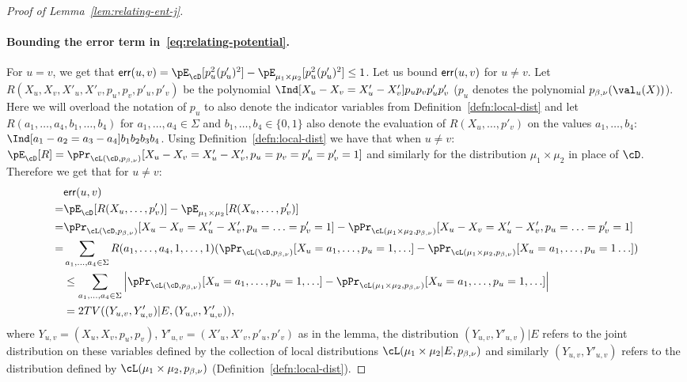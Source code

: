 \begin{proof}[Proof of Lemma~\ref{lem:relating-ent-j}]
\paragraph{Bounding the error term in~\eqref{eq:relating-potential}.} 
For $u = v$, we get that ${\sf err}(u,v) = \pE_{\cD}[p_u^2 (p'_u)^2] - \pE_{\mu_1 \times \mu_2}[p_u^2 (p'_u)^2] \leq 1$. Let us bound ${\sf err}(u,v)$ for $u \neq v$.
Let $R(X_u,X_v,X'_u,X'_v,p_{u},p_{v}, p'_u,p'_v)$ be the polynomial $\Ind[X_u - X_v = X'_u- X'_v]p_u p_v p'_u p'_v$ ($p_u$ denotes the polynomial $p_{\beta,\nu}(\val_u(X))$). Here we will overload the notation of $p_u$ to also denote the indicator variables from Definition~\ref{defn:local-dist} and let $R(a_1,\ldots,a_4,b_1,\ldots,b_4)$ for $a_1,\ldots,a_4 \in \Sigma$ and $b_1,\ldots,b_4 \in \{0,1\}$ also denote the evaluation of $R(X_u,\ldots,p'_v)$ on the values $a_1,\ldots,b_4$: $\Ind[a_1 - a_2 = a_3- a_4]b_1 b_2b_3 b_4$. Using Definition~\ref{defn:local-dist} we have that when $u \neq v$: $\pE_{\cD}[R] = \pPr_{\cL(\cD,p_{\beta,\nu})}[X_u - X_v = X'_u - X'_v, p_u = p_v = p'_u = p'_v = 1]$ and similarly for the distribution $\mu_1 \times \mu_2$ in place of $\cD$. Therefore we get that for $u \neq v$: 
\begin{align*}
&{\sf err}(u,v)\\
=&\pE_{\cD}[R(X_u,\ldots,p'_v)] - \pE_{\mu_1 \times \mu_2}[R(X_u,\ldots,p'_v)] \\
=&\pPr_{\cL(\cD,p_{\beta,\nu})}[X_u - X_v = X'_u - X'_v, p_u = \ldots =p'_v = 1] - \pPr_{\cL(\mu_1 \times \mu_2,p_{\beta,\nu})}[X_u - X_v = X'_u - X'_v, p_u = \ldots = p'_v = 1]\\
=&\sum_{\substack{a_1,\ldots,a_4 \in \Sigma}}  R(a_1,\ldots,a_4, 1,\ldots,1)(\pPr_{\cL(\cD,p_{\beta,\nu})}[X_u = a_1,\ldots,p_u =1, \ldots] - \pPr_{\cL(\mu_1 \times \mu_2,p_{\beta,\nu})}[X_u = a_1,\ldots,p_u =1 \ldots])\\
&\leq \sum_{\substack{a_1,\ldots,a_4 \in \Sigma}} \left|\pPr_{\cL(\cD,p_{\beta,\nu})}[X_u = a_1,\ldots,p_u = 1,\ldots] - \pPr_{\cL(\mu_1 \times \mu_2,p_{\beta,\nu})}[X_u = a_1,\ldots,p_u = 1,\ldots] \right| \\
&= 2 TV((Y_{u,v},Y'_{u,v})|E , (Y_{u,v},Y'_{u,v})),
\end{align*}
where $Y_{u,v} = (X_u,X_v,p_u,p_v)$, $Y'_{u,v} = (X'_u,X'_v,p'_u,p'_v)$ as in the lemma, the distribution $(Y_{u,v},Y'_{u,v})|E$ refers to the joint distribution on these variables defined by the collection of local distributions $\cL(\mu_1 \times \mu_2|E, p_{\beta,\nu})$ and similarly $(Y_{u,v},Y'_{u,v})$ refers to the distribution defined by $\cL(\mu_1 \times \mu_2,p_{\beta,\nu})$ (Definition~\ref{defn:local-dist}). 


\end{proof}

